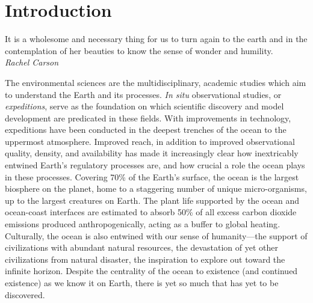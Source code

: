 \chapter{Introduction}
\label{chap:intro}

\begin{center}
    \begin{minipage}{0.7\textwidth}
      \begin{small}
       It is a wholesome and necessary thing for us to turn again to the earth and in the contemplation of her beauties to know the sense of wonder and humility.\\ \emph{Rachel Carson}
      \end{small}
    \end{minipage}
    \vspace{0.5cm}
\end{center}



The environmental sciences are the multidisciplinary, academic studies which aim to understand the Earth and its processes.
\emph{In situ} observational studies, or \emph{expeditions}, serve as the foundation on which scientific discovery and model development are predicated in these fields.
With improvements in technology, expeditions have been conducted in the deepest trenches of the ocean to the uppermost atmosphere.
Improved reach, in addition to improved observational quality, density, and availability has made it increasingly clear how inextricably entwined Earth's regulatory processes are, and how crucial a role the ocean plays in these processes.
Covering 70\% of the Earth's surface, the ocean is the largest biosphere on the planet, home to a staggering number of unique micro-organisms, up to the largest creatures on Earth.
The plant life supported by the ocean and ocean-coast interfaces are estimated to absorb 50\% of all excess carbon dioxide emissions produced anthropogenically, acting as a buffer to global heating\autocite{hori2019blue}.
Culturally, the ocean is also entwined with our sense of humanity---the support of civilizations with abundant natural resources, the devastation of yet other civilizations from natural disaster, the inspiration to explore out toward the infinite horizon.
Despite the centrality of the ocean to existence (and continued existence) as we know it on Earth, there is yet so much that has yet to be discovered.

